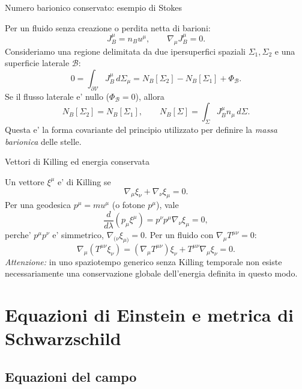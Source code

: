\begin{frame}[t]{Numero barionico conservato: esempio di Stokes}\small\raggedright

Per un fluido senza creazione o perdita netta di barioni:
\[
J_B^\mu=n_Bu^\mu,\qquad\nabla_\mu J_B^\mu=0.
\]
Consideriamo una regione delimitata da due ipersuperfici spaziali $\Sigma_1,\Sigma_2$ e una superficie laterale $\mathcal B$:
\[
0=\int_{\partial\mathcal V}J_B^\mu\,d\Sigma_\mu
=N_B[\Sigma_2]-N_B[\Sigma_1]+\Phi_{\mathcal B}.
\]
Se il flusso laterale e' nullo ($\Phi_{\mathcal B}=0$), allora
\[
N_B[\Sigma_2]=N_B[\Sigma_1],\qquad
N_B[\Sigma]=\int_\Sigma J_B^\mu n_\mu\,d\Sigma.
\]
Questa e' la forma covariante del principio utilizzato per definire la \emph{massa barionica} delle stelle.

\end{frame}

\begin{frame}[t]{Vettori di Killing ed energia conservata}\small\raggedright

Un vettore $\xi^\mu$ e' di Killing se
\[
\nabla_\mu\xi_\nu+\nabla_\nu\xi_\mu=0.
\]
Per una geodesica $p^\mu=mu^\mu$ (o fotone $p^\mu$), vale
\[
\frac d{d\lambda}(p_\mu\xi^\mu)
=p^\nu p^\mu\nabla_\nu\xi_\mu=0,
\]
perche' $p^\mu p^\nu$ e' simmetrico, $\nabla_{(\nu}\xi_{\mu)}=0$.
\medskip
Per un fluido con $\nabla_\mu T^{\mu\nu}=0$:
\[
\nabla_\mu(T^{\mu\nu}\xi_\nu)
=(\nabla_\mu T^{\mu\nu})\xi_\nu
+T^{\mu\nu}\nabla_\mu\xi_\nu=0.
\]
\textit{Attenzione:} in uno spaziotempo generico senza Killing temporale non esiste necessariamente una conservazione globale dell'energia definita in questo modo.

\end{frame}

\section{Equazioni di Einstein e metrica di Schwarzschild}

\subsection{Equazioni del campo}

